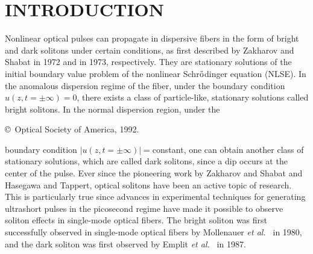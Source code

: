 \begin{abstract}
The technique for generating dark solitons with constant background using
guided-wave Mach--Zehnder interferometers is further examined. Under
optimal conditions, a reduction of 30\% in both the input optical power and
the driving voltage can be achieved, as compared with the case of complete
modulation.  Dark solitons are also found to experience compression through
amplification.  When the gain coefficient is small, adiabatic amplification
is possible.  Raman amplification can be used as the gain mechanism for
adiabatic amplification, in addition to being used for loss-compensation.
The frequency and time shifts caused by intrapulse stimulated Raman
scattering are both found to be a factor of 2 smaller than those for bright
solitons.  Finally, the propagation properties of even dark pulses are
described quantitatively.
\end{abstract}


\section{ INTRODUCTION}
\label{INT}
Nonlinear optical pulses can propagate in dispersive fibers in the form of
bright and dark solitons under certain conditions, as first described by
Zakharov and Shabat in 1972\cite{ZA} and in 1973,\cite{ZB} respectively.
They are stationary solutions of the initial boundary value problem of the
nonlinear Schr{$\rm\ddot o$}dinger equation (NLSE).\cite{SA} In the
anomalous dispersion regime of the fiber, under the boundary condition $
u( z, t = \pm \infty ) = 0 $, there exists a class of particle-like,
stationary solutions called bright solitons.\cite{HA} In the normal
dispersion region, under the
\begin{center}
{\small  \copyright\ Optical Society of America, 1992.}
\end{center}
boundary condition $ | u( z, t = \pm \infty ) | = $constant, one can obtain
another class of stationary solutions, which are called dark solitons,
since a dip occurs at the center of the pulse.\cite{HB} Ever since the
pioneering work by Zakharov and Shabat\cite{ZA,ZB} and Hasegawa and
Tappert,\cite{HA,HB} optical solitons have been an active topic of
research. This is particularly true since advances in experimental
techniques for generating ultrashort pulses in the picosecond regime have
made it possible to observe soliton effects in single-mode optical fibers.
The bright soliton was first successfully observed in single-mode optical
fibers by Mollenauer {\it et al.\ } in 1980,\cite{MA} and the dark soliton
was  first observed by Emplit {\it et al.\ } in 1987.\cite{EA}



